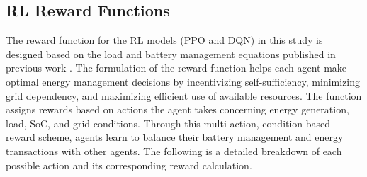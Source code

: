 \documentclass[preprint,12pt]{elsarticle}
\begin{document}
    

\subsection{RL Reward Functions}
\label{rewardfunctions}

The reward function for the RL models (PPO and DQN) in this study is designed based on the load and battery management equations published in previous work \cite{shah2024peer}. The formulation of the reward function helps each agent make optimal energy management decisions by incentivizing self-sufficiency, minimizing grid dependency, and maximizing efficient use of available resources. The function assigns rewards based on actions the agent takes concerning energy generation, load, SoC, and grid conditions. Through this multi-action, condition-based reward scheme, agents learn to balance their battery management and energy transactions with other agents. The following is a detailed breakdown of each possible action and its corresponding reward calculation.
\end{document}
